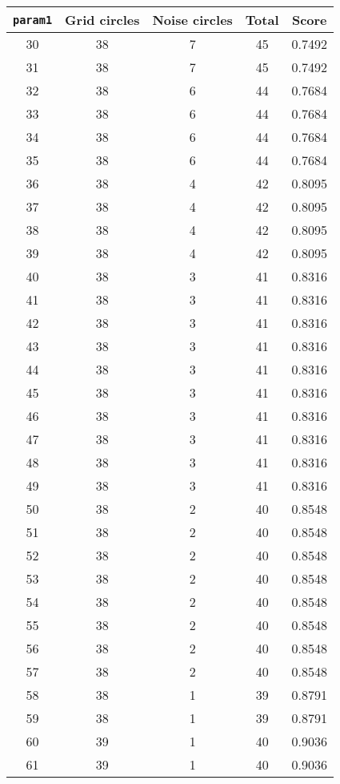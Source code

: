 \documentclass[letterpaper, 12pt]{article}
\begin{document}
\begin{longtable}{|c|c|c|c|c|}
\hline
\textbf{\texttt{param1}} & \textbf{Grid circles} & \textbf{Noise circles} & \textbf{Total} & \textbf{Score} \\
\hline
30 & 38 & 7 & 45 & 0.7492 \\
\hline
31 & 38 & 7 & 45 & 0.7492 \\
\hline
32 & 38 & 6 & 44 & 0.7684 \\
\hline
33 & 38 & 6 & 44 & 0.7684 \\
\hline
34 & 38 & 6 & 44 & 0.7684 \\
\hline
35 & 38 & 6 & 44 & 0.7684 \\
\hline
36 & 38 & 4 & 42 & 0.8095 \\
\hline
37 & 38 & 4 & 42 & 0.8095 \\
\hline
38 & 38 & 4 & 42 & 0.8095 \\
\hline
39 & 38 & 4 & 42 & 0.8095 \\
\hline
40 & 38 & 3 & 41 & 0.8316 \\
\hline
41 & 38 & 3 & 41 & 0.8316 \\
\hline
42 & 38 & 3 & 41 & 0.8316 \\
\hline
43 & 38 & 3 & 41 & 0.8316 \\
\hline
44 & 38 & 3 & 41 & 0.8316 \\
\hline
45 & 38 & 3 & 41 & 0.8316 \\
\hline
46 & 38 & 3 & 41 & 0.8316 \\
\hline
47 & 38 & 3 & 41 & 0.8316 \\
\hline
48 & 38 & 3 & 41 & 0.8316 \\
\hline
49 & 38 & 3 & 41 & 0.8316 \\
\hline
50 & 38 & 2 & 40 & 0.8548 \\
\hline
51 & 38 & 2 & 40 & 0.8548 \\
\hline
52 & 38 & 2 & 40 & 0.8548 \\
\hline
53 & 38 & 2 & 40 & 0.8548 \\
\hline
54 & 38 & 2 & 40 & 0.8548 \\
\hline
55 & 38 & 2 & 40 & 0.8548 \\
\hline
56 & 38 & 2 & 40 & 0.8548 \\
\hline
57 & 38 & 2 & 40 & 0.8548 \\
\hline
58 & 38 & 1 & 39 & 0.8791 \\
\hline
59 & 38 & 1 & 39 & 0.8791 \\
\hline
60 & 39 & 1 & 40 & 0.9036 \\
\hline
61 & 39 & 1 & 40 & 0.9036 \\

\end{longtable}
\end{document}
